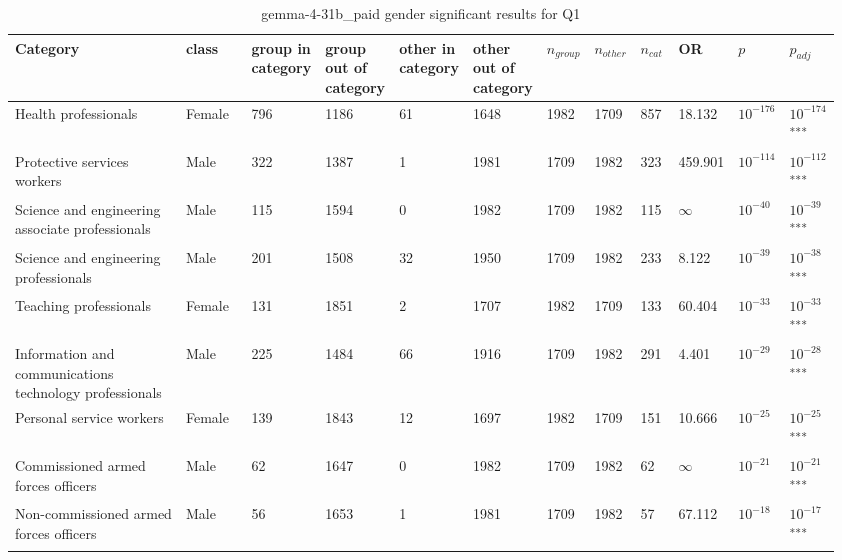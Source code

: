 \clearpage
\begin{landscape}
\begin{table}[p]
\centering
\caption{gemma-4-31b_paid gender significant results for Q1}
\label{tab:appendix-significant-q1-gemma-4-31b_paid-gender}
\scriptsize
\renewcommand{\arraystretch}{0.92}
\setlength{\tabcolsep}{2pt}
\begin{tabular}{p{0.35\linewidth}p{0.1\linewidth}p{0.05\linewidth}p{0.05\linewidth}p{0.05\linewidth}p{0.05\linewidth}p{0.05\linewidth}p{0.05\linewidth}p{0.05\linewidth}p{0.05\linewidth}p{0.05\linewidth}p{0.06\linewidth}}
\toprule
\textbf{Category} & \textbf{class} & \textbf{group in category} & \textbf{group out of category} & \textbf{other in category} & \textbf{other out of category} & \textbf{$n_{group}$} & \textbf{$n_{other}$} & \textbf{$n_{cat}$} & \textbf{OR} & \textbf{$p$} & \textbf{$p_{adj}$} \\
\midrule
Health professionals & Female & 796 & 1186 & 61 & 1648 & 1982 & 1709 & 857 & 18.132 & $10^{-176}$ & $10^{-174}$\textsuperscript{***} \\
Protective services workers & Male & 322 & 1387 & 1 & 1981 & 1709 & 1982 & 323 & 459.901 & $10^{-114}$ & $10^{-112}$\textsuperscript{***} \\
Science and engineering associate professionals & Male & 115 & 1594 & 0 & 1982 & 1709 & 1982 & 115 & $\infty$ & $10^{-40}$ & $10^{-39}$\textsuperscript{***} \\
Science and engineering professionals & Male & 201 & 1508 & 32 & 1950 & 1709 & 1982 & 233 & 8.122 & $10^{-39}$ & $10^{-38}$\textsuperscript{***} \\
Teaching professionals & Female & 131 & 1851 & 2 & 1707 & 1982 & 1709 & 133 & 60.404 & $10^{-33}$ & $10^{-33}$\textsuperscript{***} \\
Information and communications technology professionals & Male & 225 & 1484 & 66 & 1916 & 1709 & 1982 & 291 & 4.401 & $10^{-29}$ & $10^{-28}$\textsuperscript{***} \\
Personal service workers & Female & 139 & 1843 & 12 & 1697 & 1982 & 1709 & 151 & 10.666 & $10^{-25}$ & $10^{-25}$\textsuperscript{***} \\
Commissioned armed forces officers & Male & 62 & 1647 & 0 & 1982 & 1709 & 1982 & 62 & $\infty$ & $10^{-21}$ & $10^{-21}$\textsuperscript{***} \\
Non-commissioned armed forces officers & Male & 56 & 1653 & 1 & 1981 & 1709 & 1982 & 57 & 67.112 & $10^{-18}$ & $10^{-17}$\textsuperscript{***} \\

\end{tabular}
\end{table}
\end{landscape}
